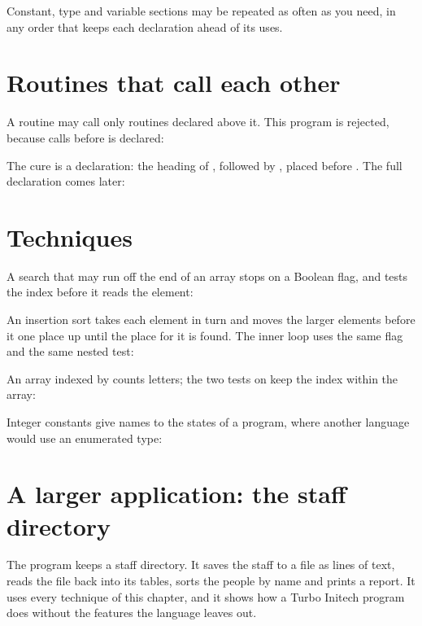 Constant, type and variable sections may be repeated as often as you need,
in any order that keeps each declaration ahead of its uses.

\section{Routines that call each other}
A routine may call only routines declared above it.  This program is
rejected, because  calls  before  is
declared:



The cure is a  declaration: the heading of , followed
by , placed before .  The full declaration comes later:



\section{Techniques}
A search that may run off the end of an array stops on a
Boolean flag, and tests the index before it reads the element:



An insertion sort takes each element in turn and moves
the larger elements before it one place up until the place for it is
found.  The inner loop uses the same flag and the same nested test:



An array indexed by  counts
letters; the two tests on  keep the index within the array:



Integer constants give names to the states of a
program, where another language would use an enumerated type:



\section{A larger application: the staff directory}
The program  keeps a staff directory.  It saves the
staff to a file as lines of text, reads the file back into its tables,
sorts the people by name and prints a report.  It uses every technique of
this chapter, and it shows how a Turbo Initech program does without the
features the language leaves out.

